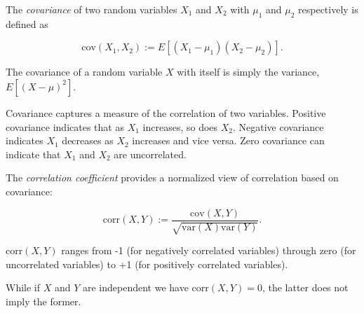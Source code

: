 \documentclass{article}
\newcommand{\var}{\mathrm{var}}
\newcommand{\cov}{\mathrm{cov}}
\newcommand{\corr}{\mathrm{corr}}
\newcommand{\defined}{:=}
\begin{document}

The \emph{covariance} of two random variables $X_1$ and $X_2$ with  $\mu_1$ and $\mu_2$ respectively is defined as

\begin{equation}
\cov(X_1,X_2) \defined E[(X_1 - \mu_1)(X_2 - \mu_2)].
\end{equation}

The covariance of a random variable $X$ with itself is simply the variance, $E[(X - \mu)^2]$.

Covariance captures a measure of the correlation of two variables.  Positive covariance indicates that as $X_1$ increases, so does $X_2$.  Negative covariance indicates $X_1$ decreases as $X_2$ increases and vice versa.  Zero covariance can indicate that $X_1$ and $X_2$ are uncorrelated.

The \emph{correlation coefficient} provides a normalized view of correlation based on covariance:

\begin{equation}
\corr(X,Y) \defined \frac{\cov(X,Y)}{\sqrt{\var(X)\var(Y)}}.
\end{equation}

$\corr(X,Y)$ ranges from -1 (for negatively correlated variables) through zero (for uncorrelated variables) to +1 (for positively correlated variables).

While if $X$ and $Y$ are independent we have $\corr(X,Y)=0$, the latter does not imply the former.
\end{document}
